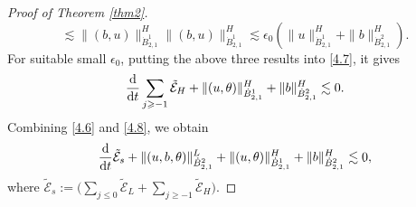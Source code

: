\documentclass[reqno]{amsart}
\begin{document}
\begin{proof}[Proof of Theorem \ref{thm2}]
\[\lesssim \|( b, u)\|_{\dot{B}^1_{2,1}}^H\|( b, u)\|_{\dot{B}^1_{2,1}}^H 
\lesssim \epsilon_0(\|u\|_{\dot{B}^1_{2,1}}^H+\|b\|_{\dot{B}^2_{2,1}}^H).
\]
For suitable small $\epsilon_0$, putting the above three results into \eqref{4.7}, 
it gives
\begin{equation}\label{4.8}
 \frac{\rm d}{{\rm d}t}\sum_{j\geqslant-1}\tilde{\mathcal{E}}_H
 +\|(u,\theta)\|_{\dot{B}^1_{2,1}}^H+\|b\|_{\dot{B}^2_{2,1}}^H\lesssim 0.
\end{equation}
Combining \eqref{4.6} and \eqref{4.8}, we obtain
 \begin{equation}\label{4.9}
\frac{\rm d}{{\rm d}t}\tilde{\mathcal{E}}_s+\|(u,b,\theta)\|_{\dot{B}^2_{2,1}}^L
+\|(u,\theta)\|_{\dot{B}^1_{2,1}}^H+\|b\|_{\dot{B}^2_{2,1}}^H\lesssim 0,
\end{equation}
where $\tilde{\mathcal{E}}_s:=\big(\sum_{j\leqslant 0}\tilde{\mathcal{E}}_L
+\sum_{j\geqslant-1}\tilde{\mathcal{E}}_H\big)$.


\end{proof}
\end{document}
